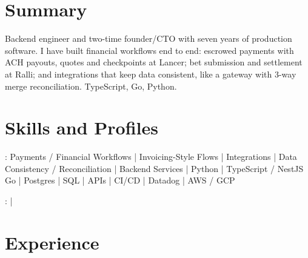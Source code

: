 \documentclass[print]{jack-resume}
\begin{document}
\pagecolor{darkmodeBackground}


\begin{minipage}[t][1cm][t]{.03\textwidth}
    \hfill
\end{minipage}

\section{Summary}
Backend engineer and two-time founder/CTO with seven years of production software. I have built financial workflows end to end: escrowed payments with ACH payouts, quotes and checkpoints at Lancer; bet submission and settlement at Ralli; and integrations that keep data consistent, like a gateway with 3-way merge reconciliation. TypeScript, Go, Python.
\sectionsep

\section{Skills and Profiles}
:
Payments / Financial Workflows \hfill | \hfill
Invoicing-Style Flows \hfill | \hfill
Integrations \hfill | \hfill
Data Consistency / Reconciliation \hfill | \hfill
Backend Services \hfill | \hfill
Python \hfill | \hfill
TypeScript / NestJS \\
\hspace{1.0cm} Go \hfill | \hfill
Postgres \hfill | \hfill
SQL \hfill | \hfill
APIs \hfill | \hfill
CI/CD \hfill | \hfill
Datadog \hfill | \hfill
AWS / GCP \\

\raggedright{
    :
      \href{https://www.linkedin.com/in/jack-sturtevant/}{ \ExternalLink} |
     \href{https://github.com/jacksturt}{ \ExternalLink}}

\section{Experience}
\end{document}
